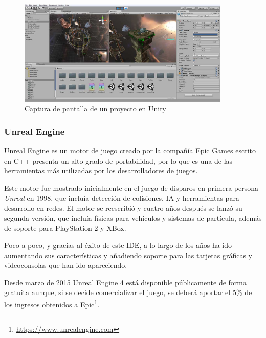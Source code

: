 \begin{figure}[!h]
\begin{center}
\includegraphics[width=0.9\textwidth]{imagenes/2/unity.jpg}
\caption{Captura de pantalla de un proyecto en Unity}
\label{fig:unity}
\end{center}
\end{figure}


\subsubsection{Unreal Engine}

Unreal Engine es un motor de juego creado por la compañía Epic Games escrito en C++ presenta un alto grado de portabilidad, por lo que es una de las herramientas más utilizadas por los desarrolladores de juegos.

Este motor fue mostrado inicialmente en el juego de disparos en primera persona \textit{Unreal} en 1998, que incluía detección de colisiones, IA y herramientas para desarrollo en redes. El motor se reescribió y cuatro años después se lanzó su segunda versión, que incluía físicas para vehículos y sistemas de partícula, además de soporte para PlayStation 2 y XBox.

Poco a poco, y gracias al éxito de este \acs{IDE}, a lo largo de los años ha ido aumentando sus características y añadiendo soporte para las tarjetas gráficas y videoconsolas que han ido apareciendo.

Desde marzo de 2015 Unreal Engine 4 está disponible públicamente de forma gratuita aunque, si se decide comercializar el juego, se deberá aportar el 5\% de los ingresos obtenidos a Epic\footnote{\url{https://www.unrealengine.com}}.

